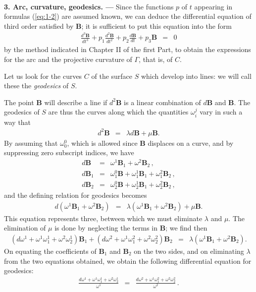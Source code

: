 
\ \\

{\bf 3. Arc, curvature, geodesics. --- }
% 
Since the functions $p$ of $t$ appearing in formulas (\ref{eq:1-2}) are assumed known, we can deduce the differential equation of third order satisfied by $\bm B$; it is sufficient to put this equation into the form
\begin{eqnarray*}
\frac{d^3 \bm B}{dt^3}  + p_1 \frac{d^2 \bm B}{dt^2} + p_2 \frac{d \bm B}{dt} + p_3 \bm B &=& 0 
\end{eqnarray*}
by the method indicated in Chapter II of the first Part, to obtain the expressions for the arc and the projective curvature of $\Gamma$, that is, of $C$. 

Let us look for the curves $C$ of the surface $S$ which develop into lines: we will call these the {\em geodesics} of $S$. 

The point $\bm B$ will describe a line if $d^2\bm B$ is a linear combination of $d\bm B$ and $\bm B$. The geodesics of $S$ are thus the curves along which the quantities $\omega^j_i$ vary in such a way that 
\begin{eqnarray*}
d^2\bm B &=& \lambda d\bm B + \mu\bm B .
\end{eqnarray*}
By assuming that $\omega^0_0$, which is allowed since $\bm B$ displaces on a curve, and by suppressing zero subscript indices, we have
\begin{eqnarray*}
d\bm B &=& \omega^1 \bm B_1 + \omega^2 \bm B_2\, ,
\\ 
d\bm B_1 &=& \omega^0_1 \bm B + \omega^1_1 \bm B_1 + \omega^2_1 \bm B_2 \, ,  
\\
d\bm B_2 &=& \omega^0_2 \bm B + \omega^1_2 \bm B_1 + \omega^2_2 \bm B_2\, ,
\end{eqnarray*}
and the defining relation for geodesics becomes
\begin{eqnarray*}
d \left( \omega^1 \bm B_1 + \omega^2 \bm B_2 \right) 
&=& \lambda \left( \omega^1 \bm B_1 + \omega^2 \bm B_2 \right)  + \mu\bm B .
\end{eqnarray*}
This equation represents three, between which we must eliminate $\lambda$ and $\mu$. The elimination of $\mu$ is done by neglecting the terms in $\bm B$; we find then
\begin{eqnarray*}
\left( d\omega^1 + \omega^1 \omega^1_1 + \omega^2 \omega^1_2 \right) \bm B_1 
+ \left( d\omega^2 + \omega^1 \omega^2_1 + \omega^2 \omega^2_2 \right) \bm B_2
&=& \lambda \left( \omega^1 \bm B_1 + \omega^2 \bm B_2 \right) .
\end{eqnarray*}
On equating the coefficients of $\bm B_1$ and $\bm B_2$ on the two sides, and on eliminating $\lambda$ from the two equations obtained, we obtain the following differential equation for geodesics:
\begin{eqnarray}
\frac{d\omega^1 + \omega^1 \omega^1_1 + \omega^2 \omega^1_2 }{\omega^1} 
&=& \frac{d\omega^2 + \omega^1 \omega^2_1 + \omega^2 \omega^2_2 }{\omega^2} \, .
\label{eq:1-3}
\end{eqnarray}

